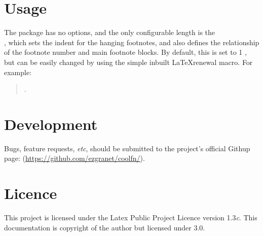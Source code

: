 \documentclass[12pt]{article}
\begin{document}
\section{Usage}
The package has no options, and the only configurable length is the \\\texttt{\fnindent}, which sets the indent for the hanging footnotes, and also defines the relationship of the footnote number and main footnote blocks.  By default, this is set to 1 , but can be easily changed by using the simple inbuilt \LaTeX renewal macro. For example:
\begin{quote}
 \texttt{\renewcommand{\fnindent}{1.25em}}.
\end{quote}
\section{Development}
Bugs, feature requests, \textit{etc}, should be submitted to the project's official Githup page: (\url{https://github.com/ezgranet/coolfn/}).

\section{Licence}
	This project is licensed under the Latex Public Project Licence version 1.3\textit{c}. This documentation is copyright of the author but licensed under  3.0.

\clearpage
\end{document}
